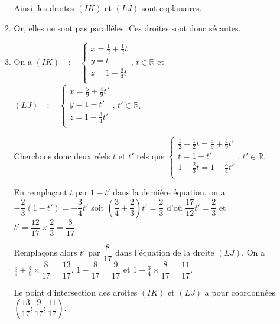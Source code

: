 \documentclass[11pt,fleqn, openany]{book} %
\begin{document}
\begin{solution}
\begin{enumerate}
\begin{enumerate}
Ainsi, les droites $(IK)$ et $(LJ)$ sont coplanaires. 

\item Or, elles ne sont pas parallèles. Ces droites sont donc sécantes.

\item On a $(IK)\quad : \quad \left\{ \begin{array}{l}x=\frac{1}{2}+\frac{1}{2}t \\ y=t\\ z=1 -\frac{2}{3}t\\
\end{array}\right.,\, t\in\mathbb{R}$ et $(LJ) \quad : \quad \left\{ \begin{array}{l}x=\frac{5}{9}+\frac{4}{9}t' \\ y=1-t'\\ z=1 -\frac{3}{4}t'\\
\end{array}\right.,\, t'\in\mathbb{R}$.

Cherchons donc deux réels $t$ et $t'$ tels que $\left\{ \begin{array}{l}\frac{1}{2}+\frac{1}{2}t=\frac{5}{9}+\frac{4}{9}t' \\ t=1-t'\\ 1 -\frac{2}{3}t=1 -\frac{3}{4}t'\\
\end{array}\right.,\, t'\in\mathbb{R}$.

En remplaçant $t$ par $1-t'$ dans la dernière équation, on a $-\dfrac{2}{3}(1-t')=-\dfrac{3}{4}t'$ soit $\left(\dfrac{3}{4}+\dfrac{2}{3}\right)t'=\dfrac{2}{3}$ d'où $\dfrac{17}{12}t'
=\dfrac{2}{3}$ et $t'=\dfrac{12}{17} \times \dfrac{2}{3}=\dfrac{8}{17}$. 

Remplaçons alors $t'$ par $\dfrac{8}{17}$ dans l'équation de la droite $(LJ)$. On a $\frac{5}{9}+\frac{4}{9} \times \dfrac{8}{17} = \dfrac{13}{17}$, $1-\dfrac{8}{17}=\dfrac{9}{17}$ et $1 -\frac{3}{4} \times \dfrac{8}{17}=\dfrac{11}{17}$.

Le point d'intersection des droites $(IK)$ et $(LJ)$ a pour coordonnées $\left(\dfrac{13}{17};\dfrac{9}{17};\dfrac{11}{17}\right)$.\end{enumerate}\end{enumerate}
\end{solution}
\end{document}
